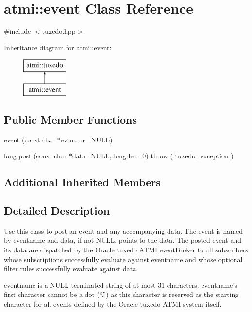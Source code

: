 \hypertarget{classatmi_1_1event}{\section{atmi\+:\+:event Class Reference}
\label{classatmi_1_1event}
}


{\ttfamily \#include $<$tuxedo.\+hpp$>$}

Inheritance diagram for atmi\+:\+:event\+:\begin{figure}[H]
\begin{center}
\leavevmode
\includegraphics[height=2.000000cm]{classatmi_1_1event}
\end{center}
\end{figure}
\subsection*{Public Member Functions}
\begin{DoxyCompactItemize}
\item 
\hyperlink{classatmi_1_1event_a64e8905f6b027d052074cb801567b1b3}{event} (const char $\ast$evtname=N\+U\+L\+L)
\item 
long \hyperlink{classatmi_1_1event_a0b1f1faae17aa923ce5a4a0d45cfcd07}{post} (const char $\ast$data=N\+U\+L\+L, long len=0)  throw ( tuxedo\+\_\+exception )
\end{DoxyCompactItemize}
\subsection*{Additional Inherited Members}


\subsection{Detailed Description}
Use this class to post an event and any accompanying data. The event is named by eventname and data, if not N\+U\+L\+L, points to the data. The posted event and its data are dispatched by the Oracle tuxedo A\+T\+M\+I event\+Broker to all subscribers whose subscriptions successfully evaluate against eventname and whose optional filter rules successfully evaluate against data.

eventname is a N\+U\+L\+L-\/terminated string of at most 31 characters. eventname’s first character cannot be a dot (“.\+”) as this character is reserved as the starting character for all events defined by the Oracle tuxedo A\+T\+M\+I system itself.

